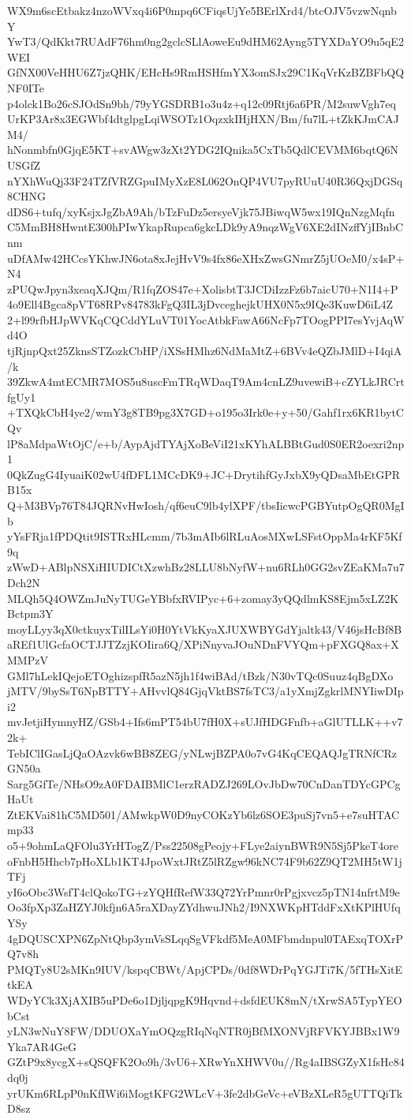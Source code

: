 WX9m6scEtbakz4nzoWVxq4i6P0mpq6CFiqsUjYe5BErlXrd4/btcOJV5vzwNqnbY
YwT3/QdKkt7RUAdF76hm0ng2gclcSLlAoweEu9dHM62Ayng5TYXDaYO9u5qE2WEI
GfNX00VeHHU6Z7jzQHK/EHcHs9RmHSHfmYX3omSJx29C1KqVrKzBZBFbQQNF0ITe
p4olck1Bo26cSJOdSn9bh/79yYGSDRB1o3u4z+q12c09Rtj6a6PR/M2suwVgh7eq
UrKP3Ar8x3EGWbf4dtglpgLqiWSOTz1OqzxkIHjHXN/Bm/fu7lL+tZkKJmCAJM4/
hNonmbfn0GjqE5KT+svAWgw3zXt2YDG2IQnika5CxTb5QdlCEVMM6bqtQ6NUSGfZ
nYXhWuQj33F24TZfVRZGpuIMyXzE8L062OnQP4VU7pyRUuU40R36QxjDGSq8CHNG
dDS6+tufq/xyKsjxJgZbA9Ah/bTzFuDz5ersyeVjk75JBiwqW5wx19IQnNzgMqfn
C5MmBH8HwntE300hPIwYkapRupca6gkcLDk9yA9nqzWgV6XE2dINzffYjIBnbCnm
uDfAMw42HCcsYKhwJN6ota8xJejHvV9s4fx86eXHxZwsGNmrZ5jUOeM0/x4sP+N4
zPUQwJpyn3xeaqXJQm/R1fqZOS47e+XolisbtT3JCDiIzzFz6b7aicU70+N1I4+P
4o9Ell4Bgca8pVT68RPv84783kFgQ3IL3jDvceghejkUHX0N5x9IQe3KuwD6iL4Z
2+l99rfbHJpWVKqCQCddYLuVT01YocAtbkFawA66NcFp7TOogPPI7esYvjAqWd4O
tjRjnpQxt25ZknsSTZozkCbHP/iXSsHMhz6NdMaMtZ+6BVv4eQZbJMlD+I4qiA/k
39ZkwA4mtECMR7MOS5u8uscFmTRqWDaqT9Am4cnLZ9uvewiB+cZYLkJRCrtfgUy1
+TXQkCbH4ye2/wmY3g8TB9pg3X7GD+o195o3Irk0e+y+50/Gahf1rx6KR1bytCQv
lP8aMdpaWtOjC/e+b/AypAjdTYAjXoBeViI21xKYhALBBtGud0S0ER2oexri2np1
0QkZugG4IyuaiK02wU4fDFL1MCcDK9+JC+DrytihfGyJxbX9yQDsaMbEtGPRB15x
Q+M3BVp76T84JQRNvHwIosh/qf6euC9lb4ylXPF/tbsIicwcPGBYutpOgQR0MgIb
yYsFRja1fPDQtit9ISTRxHLcmm/7b3mAIb6lRLuAosMXwLSFstOppMa4rKF5Kf9q
zWwD+ABlpNSXiHIUDICtXzwhBz28LLU8bNyfW+nu6RLh0GG2svZEaKMa7u7Dch2N
MLQh5Q4OWZmJuNyTUGeYBbfxRVIPyc+6+zomay3yQQdlmKS8Ejm5xLZ2KBctpm3Y
moyLLyy3qX0ctkuyxTilILsYi0H0YtVkKyaXJUXWBYGdYjaltk43/V46jsHcBf8B
aREf1UlGcfaOCTJJTZzjKOIira6Q/XPiNnyvaJOuNDnFVYQm+pFXGQ8ax+XMMPzV
GMl7hLekIQejoETOghizspfR5azN5jh1f4wiBAd/tBzk/N30vTQc0Suuz4qBgDXo
jMTV/9bySsT6NpBTTY+AHvvlQ84GjqVktBS7fsTC3/a1yXmjZgkrlMNYIiwDIpi2
mvJetjiHymnyHZ/GSb4+Ifs6mPT54bU7fH0X+sUJfHDGFnfb+aGlUTLLK++v72k+
TebIClIGasLjQaOAzvk6wBB8ZEG/yNLwjBZPA0o7vG4KqCEQAQJgTRNfCRzGN50a
Sarg5GfTe/NHsO9zA0FDAIBMlC1erzRADZJ269LOvJbDw70CnDanTDYcGPCgHaUt
ZtEKVai81hC5MD501/AMwkpW0D9nyCOKzYb6lz6SOE3puSj7vn5+e7suHTACmp33
o5+9ohmLaQFOlu3YrHTogZ/Pss22508gPeojy+FLye2aiynBWR9N5Sj5PkeT4ore
oFnbH5Hhcb7pHoXLb1KT4JpoWxtJRtZ5lRZgw96kNC74F9b62Z9QT2MH5tW1jTFj
yI6oObc3WsfT4clQokoTG+zYQHfRefW33Q72YrPmnr0rPgjxvcz5pTN14nfrtM9e
Oo3fpXp3ZaHZYJ0kfjn6A5raXDayZYdhwuJNh2/I9NXWKpHTddFxXtKPlHUfqYSy
4gDQUSCXPN6ZpNtQbp3ymVsSLqqSgVFkdf5MeA0MFbmdnpul0TAExqTOXrPQ7v8h
PMQTy8U2sMKn9IUV/kspqCBWt/ApjCPDs/0df8WDrPqYGJTi7K/5fTHsXitEtkEA
WDyYCk3XjAXIB5uPDe6o1DjljqpgK9Hqvnd+dsfdEUK8mN/tXrwSA5TypYEObCst
yLN3wNuY8FW/DDUOXaYmOQzgRIqNqNTR0jBfMXONVjRFVKYJBBx1W9Yka7AR4GeG
GZtP9x8ycgX+sQSQFK2Oo9h/3vU6+XRwYnXHWV0u//Rg4aIBSGZyX1fsHc84dq0j
yrUKm6RLpP0nKfIWi6iMogtKFG2WLcV+3fe2dbGeVc+eVBzXLeR5gUTTQiTkD8sz

